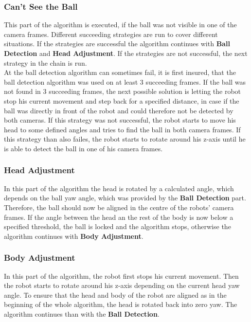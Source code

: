 \subsubsection*{Can't See the Ball} 
This part of the algorithm is executed, if the ball was not visible in one of the camera frames. Different succeeding strategies are run to cover different situations. If the strategies are successful the algorithm continues with \textbf{Ball Detection} and \textbf{Head Adjustment}. If the strategies are not successful, the next strategy in the chain is run. \\
At the ball detection algorithm can sometimes fail, it is first insured, that 
the ball detection algorithm was used on at least 3 succeeding frames. If the ball was not found in 3 succeeding frames, the next possible solution is letting the robot stop his current movement and step back for a specified distance, in case if the ball was directly in front of the robot and could therefore not be detected by both cameras. If this strategy was not successful, the robot starts to move his head to some defined angles and tries to find the ball in both camera frames. If this strategy than also failes, the robot starts to rotate around his z-axis until he is able to detect the ball in one of his camera frames.

\subsubsection*{Head Adjustment}
\label{j sec head adjustment}
In this part of the algorithm the head is rotated by a calculated angle, which depends on the ball yaw angle, which was provided by the \textbf{Ball Detection} part.
Therefore, the ball should now be aligned in the centre of the robots' camera frames.
If the angle between the head an the rest of the body is now below a specified threshold, the ball is locked and the algorithm stops, otherwise the algorithm continues with \textbf{Body Adjustment}. 

\subsubsection*{Body Adjustment}
\label{j sec body adjustment}
In this part of the algorithm, the robot first stops his current movement. Then the robot starts to rotate around his z-axis depending on the current head yaw angle. To ensure that the head and body of the robot are aligned as in the beginning of the whole algorithm, the head is rotated back into zero yaw. The algorithm continues than with the \textbf{Ball Detection}.

